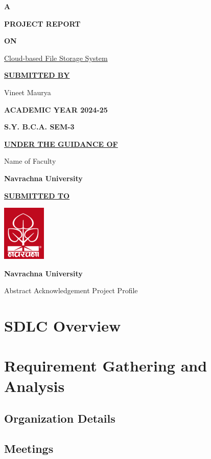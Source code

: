\documentclass[12pt,a4paper]{report}
\begin{document}
\begin{center}
  \textbf{\LARGE{A}}

  \textbf{\LARGE{PROJECT REPORT}}

  \textbf{\LARGE{ON}}

  \Large{\underline{Cloud-based File Storage System}}
  \vspace{1cm}

  \textbf{\underline{SUBMITTED BY}}

  Vineet Maurya
  \vspace{1cm}

  \textbf{ACADEMIC YEAR 2024-25}

  \textbf{S.Y. B.C.A. SEM-3}
  \vspace{1cm}

  \textbf{\underline{UNDER THE GUIDANCE OF}}

  Name of Faculty

  \textbf{Navrachna University}
  \vspace{1cm}

  \textbf{\underline{SUBMITTED TO}}
  \vspace{0.5cm}

  \includegraphics{nuv_logo.png}
  \vspace{0.5cm}

  \textbf{Navrachna University}
\end{center}
\newpage
{}
\setcounter{page}{1}
Abstract
\newpage
Acknowledgement
\newpage
Project Profile
\newpage
{}
\tableofcontents
\newpage
{}
\setcounter{page}{1}
\chapter{SDLC Overview}
\newpage
\chapter{Requirement Gathering and Analysis}
\section{Organization Details}
\section{Meetings}
\end{document}
